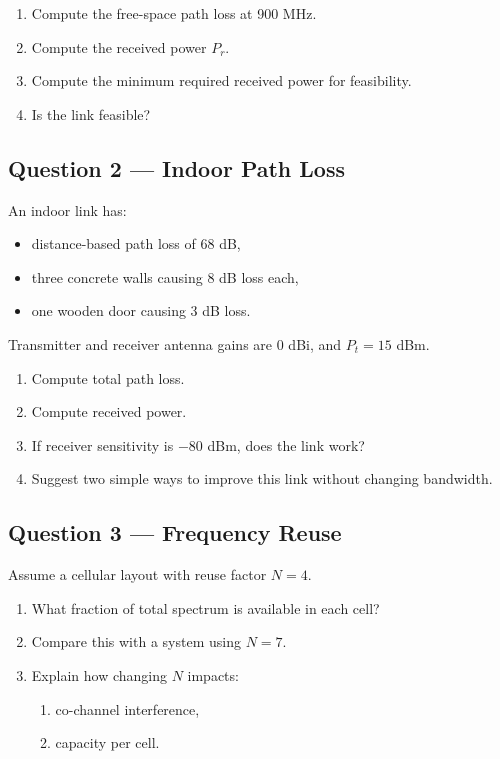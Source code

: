\documentclass[11pt,a4paper]{article}
\begin{document}
\begin{enumerate}[label=\alph*)]
    \item Compute the free-space path loss at 900 MHz.
    \item Compute the received power $P_r$.
    \item Compute the minimum required received power for feasibility.
    \item Is the link feasible?
\end{enumerate}

\subsection*{Question 2 --- Indoor Path Loss}
An indoor link has:
\begin{itemize}[leftmargin=1.2cm]
    \item distance-based path loss of $68$ dB,
    \item three concrete walls causing $8$ dB loss each,
    \item one wooden door causing $3$ dB loss.
\end{itemize}

Transmitter and receiver antenna gains are $0$ dBi, and $P_t = 15$ dBm.

\begin{enumerate}[label=\alph*)]
    \item Compute total path loss.
    \item Compute received power.
    \item If receiver sensitivity is $-80$ dBm, does the link work?
    \item Suggest two simple ways to improve this link without changing bandwidth.
\end{enumerate}

\subsection*{Question 3 --- Frequency Reuse}
Assume a cellular layout with reuse factor $N=4$.

\begin{enumerate}[label=\alph*)]
    \item What fraction of total spectrum is available in each cell?
    \item Compare this with a system using $N=7$.
    \item Explain how changing $N$ impacts:
    \begin{enumerate}[label=\roman*)]
        \item co-channel interference,
        \item capacity per cell.
    \end{enumerate}
\end{enumerate}
\end{document}

